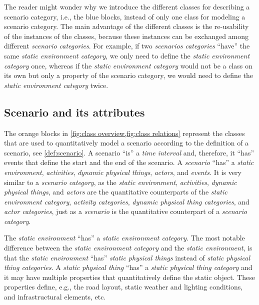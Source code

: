 The reader might wonder why we introduce the different classes for describing a scenario category, i.e., the blue blocks, instead of only one class for modeling a scenario category. 
The main advantage of the different classes is the re-usability of the instances of the classes, because these instances can be exchanged among different \textit{scenario categories}. For example, if two \textit{scenarios categories} ``have'' the same \textit{static environment category}, we only need to define the \textit{static environment category} once, whereas if the \textit{static environment category} would not be a class on its own but only a property of the scenario category, we would need to define the \textit{static environment category} twice.



\subsection{Scenario and its attributes}
\label{sec:domain scenario}

The orange blocks in \cref{fig:class overview,fig:class relations} represent the classes that are used to quantitatively model a scenario according to the definition of a scenario, see \cref{def:scenario}. 
\cstartb A scenario ``is'' a \textit{time interval} and, therefore, it ``has'' events that define the start and the end of the scenario. \cendb
A \textit{scenario} ``has'' a \textit{static environment}, \textit{activities}, \cstartb \textit{dynamic physical things}, \cendb \textit{actors}, and \textit{events}. 
It is very similar to a \textit{scenario category}, as the \textit{static environment}, \textit{activities}, \cstartb \textit{dynamic physical things}, \cendb and \textit{actors} are the quantitative counterparts of the \textit{static environment category}, \textit{activity categories}, \cstartb \textit{dynamic physical thing categories}, \cendb and \textit{actor categories}, just as a \textit{scenario} is the quantitative counterpart of a \textit{scenario category}. 

The \textit{static environment} ``has'' a \textit{static environment category}. The most notable difference between the \textit{static environment category} and the \textit{static environment}, is that the \textit{static environment} \cstartb ``has'' \textit{static physical things} instead of \textit{static physical thing categories}. A \textit{static physical thing} ``has'' a \textit{static physical thing category} and it may have multiple properties that quantitatively define the static object. \cendb These properties define, e.g., the road layout, static weather and lighting conditions, and infrastructural elements, etc.

